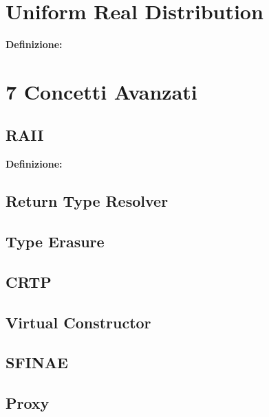 
\newpage

\section{Uniform Real Distribution}

\textsf{\small \textbf{Definizione: } } \\



\newpage




\section{7 Concetti Avanzati}

\subsection{RAII}

\textsf{\small \textbf{Definizione: } } \\ %

\subsection{Return Type Resolver}

\subsection{Type Erasure}

\subsection{CRTP}

\subsection{Virtual Constructor}

\subsection{SFINAE}


\subsection{Proxy}


